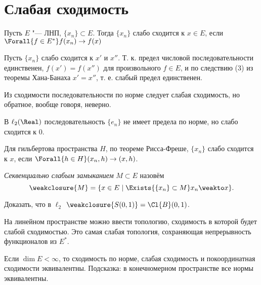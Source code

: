 \documentclass[main]{subfiles}
\begin{document}
\section{Слабая сходимость} %

\begin{definition}
  Пусть \( E \) "--- ЛНП, \( \{ x_n \} \subset E \). Тогда 
  \( \{ x_n \} \) слабо сходится к \( x \in E \), если
  \( \Forall{f \in E^*} f(x_n) \to f(x) \)
\end{definition}

\begin{remark}
  Пусть $\{ x_n \}$ слабо сходится к $x'$ и $x''$.
  Т. к. предел числовой последовательности единственен,
  $f(x') = f(x'')$ для произвольного $f \in E$, и по следствию
  (3) из теоремы Хана-Банаха $x' = x''$,
  т. е. слабый предел единственен.
\end{remark}

\begin{remark}
  Из сходимости последовательности по норме следует слабая
  сходимость, но обратное, вообще говоря, неверно.
\end{remark}
\begin{example}
  В \( \ell_2(\Real) \) последовательность \( \{ e_n \} \)
  не имеет предела по норме, но слабо сходится к \( 0 \).
\end{example}

\begin{remark}
  Для гильбертова пространства \( H \),
  по теореме Рисса-Фреше, \( \{ x_n \} \)
  слабо сходится к \( x \), если \( \Forall{h \in H}
  (x_n, h) \to (x, h) \).
\end{remark}

\begin{definition}
  \emph{Секвенциально слабым замыканием} $M \subset E$ назовём
  \[ \weakclosure{M} = \{ x \in E \mid \Exists{ \{ x_n \} \subset M } x_n \weakto x \}. \]
\end{definition}

\begin{exercise}
  Доказать, что в \( \ell_2 \) \( \weakclosure{S(0, 1)} = \Cl{B}(0, 1) \).
\end{exercise}

На линейном пространстве можно ввести топологию,
сходимость в которой будет слабой сходимостью.
Это самая слабая топология,
сохраняющая непрерывность функционалов из $E^*$.

\begin{exercise}
  Если $\dim E < \infty$, то сходимость по норме, слабая сходимость
  и покоординатная сходимости эквивалентны.
  Подсказка: в конечномерном пространстве все нормы эквивалентны.
\end{exercise}
\end{document}
